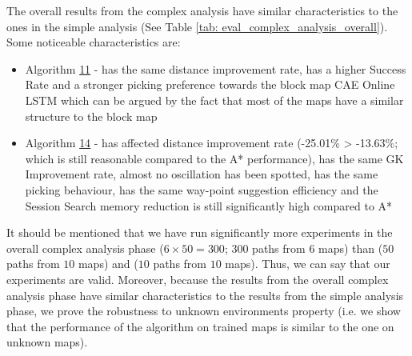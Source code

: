The overall results from the complex analysis have similar characteristics to the ones in the simple analysis (See Table \ref{tab: eval_complex_analysis_overall}). Some noticeable characteristics are: 

\begin{itemize}
    \item Algorithm \hyperref[tab: evalalgorithms]{11} - has the same distance improvement rate, has a higher Success Rate and a stronger picking preference towards the block map CAE Online LSTM which can be argued by the fact that most of the maps have a similar structure to the block map 
    \item Algorithm \hyperref[tab: evalalgorithms]{14} - has affected distance improvement rate (-25.01\% > -13.63\%; which is still reasonable compared to the A* performance), has the same GK Improvement rate, almost no oscillation has been spotted, has the same picking behaviour, has the same way-point suggestion efficiency and the Session Search memory reduction is still significantly high compared to A*
\end{itemize}{}

It should be mentioned that we have run significantly more experiments in the overall complex analysis phase ($6\times 50 = 300$; $300$ paths from $6$ maps) than \cite{nicola2018lstm} ($50$ paths from $10$ maps) and \cite{inoue2019robot} ($10$ paths from $10$ maps). Thus, we can say that our experiments are valid. Moreover, because the results from the overall complex analysis phase have similar characteristics to the results from the simple analysis phase, we prove the robustness to unknown environments property (i.e. we show that the performance of the algorithm on trained maps is similar to the one on unknown maps).